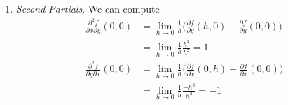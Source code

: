 \begin{solution}
\begin{enumerate}
			\item \textit{Second Partials}. We can compute 
				\begin{align}
					\frac{\partial^2 f}{\partial x \partial y} (0, 0) 
						& = \lim_{h \to 0} \frac{1}{h} \bigg( \frac{\partial f}{\partial y} (h, 0) - \frac{\partial f}{\partial y} (0, 0) \bigg) \\ 
						& = \lim_{h \to 0} \frac{1}{h} \frac{h^3}{h^2} = 1 \\ 
					\frac{\partial^2 f}{\partial y \partial x} (0, 0) 
						& = \lim_{h \to 0} \frac{1}{h} \bigg( \frac{\partial f}{\partial x} (0, h) - \frac{\partial f}{\partial x} (0, 0) \bigg) \\ 
						& = \lim_{h \to 0} \frac{1}{h} \frac{-h^3}{h^2} = -1
				\end{align}
		\end{enumerate}
	\end{solution}

